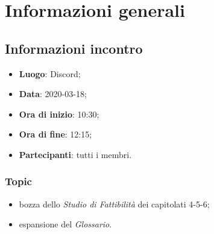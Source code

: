 \section{Informazioni generali}
\subsection{Informazioni incontro}
\begin{itemize}
\item \textbf{Luogo}: Discord\glo;
\item \textbf{Data}: 2020-03-18;
\item \textbf{Ora di inizio}: 10:30;
\item \textbf{Ora di fine}: 12:15;
\item \textbf{Partecipanti}: tutti i membri.
\end{itemize}

\subsubsection{Topic}
\begin{itemize}
\item bozza dello \textit{Studio di Fattibilità} dei capitolati 4-5-6;
\item espansione del \textit{Glossario}.
\end{itemize}